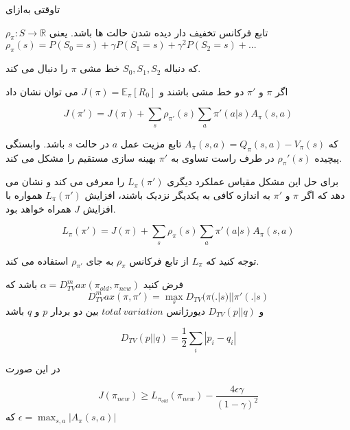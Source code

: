 

‌تاوقتی
‌به‌ازای
\cite{suttonbook}
 




$\rho_\pi : S \longrightarrow \mathbb{R}$
تابع فرکانس تخفیف دار دیده شدن حالت ها باشد. یعنی
$\rho_\pi(s) = P(S_0=s) + \gamma P(S_1=s) + \gamma^2 P(S_2=s) + ...$

که دنباله
$S_0, S_1, S_2$
خط مشی $\pi$ را دنبال می کند.


اگر $\pi$ و $\pi'$ دو خط مشی باشند و 
$J(\pi) = \mathbb{E}_\pi[R_0]$
 می توان نشان داد
\cite{schulman2015trust}

$$J(\pi')= J(\pi) + \sum_{s} \rho_{\pi'}(s) \sum_{a} \pi'(a|s) A_\pi(s,a)$$

که 
$A_\pi(s,a) = Q_\pi (s,a) - V_\pi(s)$
تابع مزیت عمل $a$ در حالت $s$ باشد.
وابستگی پیچیده 
$\rho_\pi'(s)$
در طرف راست تساوی به $\pi'$ بهینه سازی مستقیم را مشکل می کند.

برای حل این مشکل 
\cite{schulman2015trust}
مقیاس عملکرد دیگری $L_\pi(\pi')$ را معرفی می کند و نشان می دهد که اگر $\pi$ و $\pi'$ به اندازه کافی به یکدیگر نزدیک باشند، افزایش 
$L_\pi(\pi')$
 همواره با افزایش $J$ همراه خواهد بود.

$$L_\pi(\pi')= J(\pi) + \sum_{s} \rho_{\pi}(s) \sum_{a} \pi'(a|s) A_\pi(s,a)$$

توجه کنید که $L_\pi$ از تابع فرکانس $\rho_\pi$ به جای $
\rho_{\pi'}$
 استفاده می کند.
 
فرض کنید 
$\alpha = D_{TV}^max(\pi_{old}, \pi_{new})$
باشد که 
$$D_{TV}^max (\pi, \pi') = \max_{s} D_{TV}(\pi(.|s) || \pi'(.|s)$$
و 
$D_{TV}(p || q)$
دیورژانس $total \ variation$ بین دو بردار $p$ و $q$ باشد

$$D_{TV}(p || q) = \dfrac{1}{2} \sum_{i} |p_i - q_i|$$

در این صورت

$$J(\pi_{new}) \ge L_{\pi_{old}}(\pi_{new}) - \dfrac{4 \epsilon \gamma}{(1- \gamma)^2}$$
که 
$\epsilon = \max_{s,a} |A_\pi(s,a)|$

